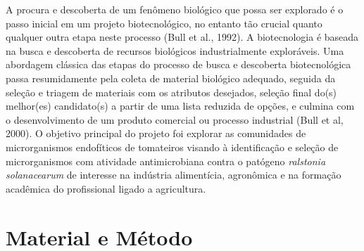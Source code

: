 \documentclass[article,12pt,onesidea,4paper,english,brazil]{abntex2}
\begin{document}
A procura e descoberta de um fenômeno biológico que possa ser explorado é o passo inicial em um projeto biotecnológico, no entanto tão crucial quanto qualquer outra etapa neste processo (Bull et al., 1992). A biotecnologia é baseada na busca e descoberta de recursos biológicos industrialmente exploráveis. Uma abordagem clássica das etapas do processo de busca e descoberta biotecnológica passa resumidamente pela coleta de material biológico adequado, seguida da seleção e triagem de materiais com os atributos desejados, seleção final do(s) melhor(es) candidato(s) a partir de uma lista reduzida de opções, e culmina com o desenvolvimento de um produto comercial ou processo industrial (Bull et al, 2000). O objetivo principal do projeto foi explorar as comunidades de microrganismos endofíticos de tomateiros visando à identificação e seleção de microrganismos com atividade antimicrobiana contra o patógeno \textit{ralstonia solanacearum} de interesse na indústria alimentícia, agronômica e na formação acadêmica do profissional ligado a agricultura.
	
	\section*{Material e Método}
	
\end{document}
